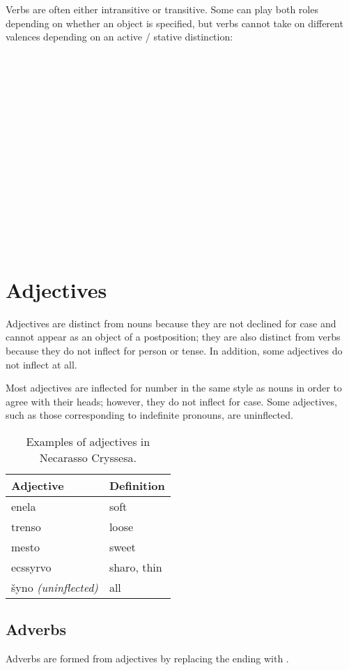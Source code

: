 \documentclass{book}
\begin{document}
Verbs are often either intransitive or transitive. Some can play both roles depending on whether an object is specified, but verbs cannot take on different valences depending on an active / stative distinction: \\
~\\
 \\
 \\
 \\
~\\
  \\
  \\
  \\
~\\
  \\
  \\
  \\
~\\
   \\
   \\
  

\chapter{Adjectives}

Adjectives are distinct from nouns because they are not declined for case and cannot appear as an object of a postposition; they are also distinct from verbs because they do not inflect for person or tense. In addition, some adjectives do not inflect at all.

Most adjectives are inflected for number in the same style as nouns in order to agree with their heads; however, they do not inflect for case. Some adjectives, such as those corresponding to indefinite pronouns, are uninflected.

\begin{table}[h]
  \caption{Examples of adjectives in Necarasso Cryssesa.}
  \centering
  \begin{tabular}{|l|l|}
    \hline
    Adjective & Definition \\
    \hline
    enela & soft \\
    trenso & loose \\
    mesto & sweet \\
    ecssyrvo & sharo, thin \\
    šyno \emph{(uninflected)} & all \\
    \hline
  \end{tabular}
\end{table}

\section{Adverbs}

Adverbs are formed from adjectives by replacing the ending with .
\end{document}
